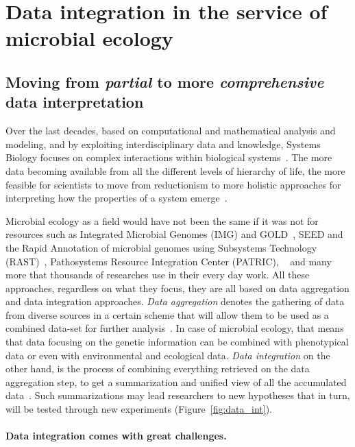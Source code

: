 \section{Data integration in the service of microbial ecology}

   \subsection{Moving from \textit{partial} to more \textit{comprehensive} data interpretation}
   \label{subsec:integration_intro}
      Over the last decades, based on
      computational and mathematical analysis and modeling,
      and by exploiting interdisciplinary data and knowledge, 
      Systems Biology focuses on complex interactions within biological systems~\citep{tavassoly2018systems}.
      The more data becoming available from all the different levels
      of hierarchy of life, the more feasible for scientists to 
      move from reductionism to more holistic approaches 
      for interpreting how the properties of a system emerge~\citep{noble2008music}.

      Microbial ecology as a field would have not been the same if it was not 
      for resources such as 
      Integrated Microbial Genomes (IMG) and GOLD~\citep{chen2021img}, 
      SEED and the Rapid Annotation of microbial genomes using Subsystems Technology (RAST)~\citep{overbeek2014seed}, 
      Pathosystems Resource Integration Center (PATRIC),
      ~\citep{zhulin2015databases}
      and many more that thousands of researches use in their every day work. 
      All these approaches, regardless on what they focus, they are all based on data aggregation and data integration approaches. 
      \textit{Data aggregation} denotes the gathering of data from diverse sources
      in a certain scheme that will allow them to be used as a combined data-set for 
      further analysis~\citep{simpson2010secure}. 
      In case of microbial ecology, that means that data focusing on the genetic 
      information can be combined with phenotypical data or even with environmental and 
      ecological data.
      \textit{Data integration} on the other hand, is the process of combining everything
      retrieved on the data aggregation step, 
      to get a summarization and unified view of all the accumulated data~\citep{schneider2012teaching}.
      Such summarizations may lead researchers to new hypotheses that 
      in turn, will be tested through new experiments (Figure~\ref{fig:data_int}).


      \paragraph{Data integration comes with great challenges.}

